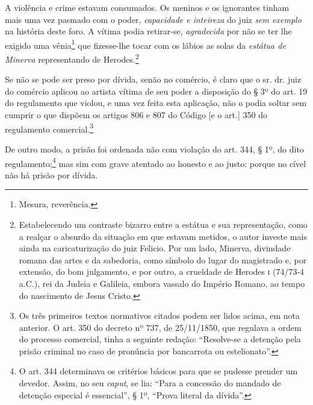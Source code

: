 A violência e crime estavam consumados. Os meninos e os ignorantes
tinham mais uma vez pasmado com o poder, \emph{capacidade e}
\emph{inteireza} do juiz \emph{sem exemplo} na história deste foro. A
vítima podia retirar-se, \emph{agradecida} por não se ter lhe exigido
uma vênia\footnote{ Mesura, reverência.} que fizesse-lhe tocar com os
lábios as solas da \emph{estátua de Minerva} representando de
Herodes.\footnote{ Estabelecendo um contraste bizarro entre a estátua e
  sua representação, como a realçar o absurdo da situação em que estavam
  metidos, o autor investe mais ainda na caricaturização do juiz
  Felicio. Por um lado, Minerva, divindade romana das artes e da
  sabedoria, como símbolo do lugar do magistrado e, por extensão, do bom
  julgamento, e por outro, a crueldade de Herodes \textsc{i} (74/73-4\,
  a.C.), rei da Judeia e Galileia, embora vassalo do Império Romano, ao
  tempo do nascimento de Jesus Cristo.}

Se não se pode ser preso por dívida, senão no comércio, é claro que o
sr. dr. juiz do comércio aplicou ao artista vítima de seu poder a
disposição do § 3º do art. 19 do regulamento que violou, e uma vez feita
esta aplicação, não o podia soltar sem cumprir o que dispõem os artigos
806 e 807 do Código {[}e o art.{]} 350 do regulamento
comercial.\footnote{ Os três primeiros textos normativos citados podem
  ser lidos acima, em nota anterior. O art. 350 do decreto nº 737, de
  25/11/1850, que regulava a ordem do processo comercial, tinha a
  seguinte redação: ``Resolve-se a detenção pela prisão criminal no caso
  de pronúncia por bancarrota ou estelionato''.}

De outro modo, a prisão foi ordenada não com violação do art. 344, § 1º,
do dito regulamento;\footnote{ O art. 344 determinava os critérios
  básicos para que se pudesse prender um devedor. Assim, no seu
  \emph{caput}, se lia: ``Para a concessão do mandado de detenção
  especial é essencial'', § 1º, ``Prova literal da dívida''.} mas sim com
grave atentado ao honesto e ao justo: porque no cível não há prisão por
dívida.

